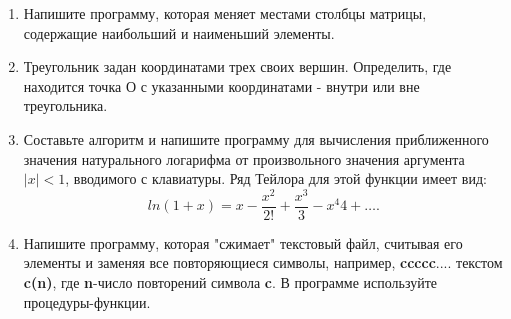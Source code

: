 \begin{enumerate}[leftmargin=*]
    \item Напишите программу, которая меняет местами столбцы матрицы, содержащие наибольший и наименьший элементы.
    \item Треугольник задан координатами трех своих вершин. Определить, где находится точка $О$ с указанными координатами - внутри или вне треугольника.
    \item Составьте алгоритм и напишите программу для вычисления приближенного значения натурального логарифма от произвольного значения аргумента $|x|<1$, вводимого с клавиатуры. Ряд Тейлора для этой функции имеет вид:
    \begin{equation*}
        ln(1+x)=x-\frac{x^2}{2!}+\frac{x^3}{3}-{x^4}{4}+\dots .
    \end{equation*}
    \item Напишите программу, которая "сжимает" текстовый файл, считывая его элементы и заменяя все повторяющиеся символы, например, \textbf{ccccc}.... текстом \textbf{c(n)}, где \textbf{n}-число повторений символа \textbf{c}. В программе используйте процедуры-функции.
\end{enumerate}